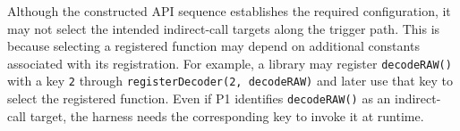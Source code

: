 





Although the constructed API sequence establishes the required configuration, it may not select the intended indirect-call targets along the trigger path.
This is because selecting a registered function may depend on additional constants associated with its registration. For example, a library may register \texttt{decodeRAW()} with a key \texttt{2} through \texttt{registerDecoder(2, decodeRAW)} and later use that key to select the registered function. Even if P1 identifies \texttt{decodeRAW()} as an indirect-call target, the harness needs the corresponding key to invoke it at runtime.

